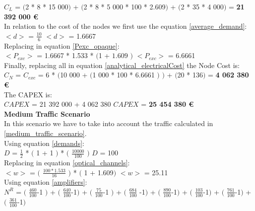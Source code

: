 $C_L$ = $($2 * 8 * 15 000$)$ + $($2 * 8 * 5 000 * 100 * 2.609$)$ + $($2 * 35 * 4 000$)$ = \textbf{21 392 000 \euro}\\

In relation to the cost of the nodes we first use the equation \ref{average_demand}:\\

$<d>$ = $\frac{10}{6}$ \qquad \qquad $<d>$ = 1.6667\\

Replacing in equation \ref{Pexc_opaque}:\\

$<P_{exc}>$ = 1.6667 * 1.533 * $($1 + $1.609$ $)$ \qquad \qquad $<P_{exc}>$ = 6.6661 \\

Finally, replacing all in equation \ref{analytical_electricalCost} the Node Cost is:\\

$C_N$ = $C_{exc}$ = 6 * $($10 000 + $($1 000 * 100 * 6.6661 $)$ $)$ + $($20 * 136$)$ = \textbf{4 062 380 \euro}\\

The CAPEX is:\\

$CAPEX$ = 21 392 000 + 4 062 380 \qquad \qquad $CAPEX$ = \textbf{25 454 380 \euro}\\

\textbf{Medium Traffic Scenario}\\

In this scenario we have to take into account the traffic calculated in \ref{medium_traffic_scenario}.\\

Using equation \ref{demands}:\\

$D$ = $\frac{1}{2}$ * $($ 1 + 1 $)$ * $($ $\frac{10000}{100}$ $)$ \qquad \qquad $D$ = 100\\

Replacing in equation \ref{optical_channels}:\\

$<w>$ = $($ $\frac{100 * 1.533}{16}$ $)$ * $($ 1 + 1.609$)$ \qquad \qquad $<w>$ = 25.11\\

Using equation \ref{amplifiers}:\\

$N^R$ = $($ $\frac{460}{100}$-1 $)$ + $($ $\frac{640}{100}$-1$)$ + $($ $\frac{75}{100}$-1 $)$ + $($ $\frac{684}{100}$ -1$)$ + $($ $\frac{890}{100}$-1$)$ + $($ $\frac{103}{100}$-1$)$ + $($ $\frac{761}{100}$-1$)$ + $($ $\frac{361}{100}$-1$)$\\

